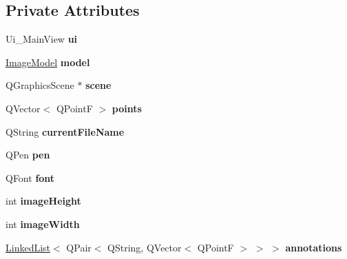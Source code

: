 \subsection*{Private Attributes}
\begin{DoxyCompactItemize}
\item 
\mbox{\label{classImageController_ac4a8d61dbfe0c1a0b63f7cd456b3c1c1}} 
Ui\+\_\+\+Main\+View {\bfseries ui}
\item 
\mbox{\label{classImageController_a7b83dbab8de169f4c1d394a72280aec5}} 
\hyperlink{classImageModel}{Image\+Model} {\bfseries model}
\item 
\mbox{\label{classImageController_a3389aebb69eca6fc69b6e8941833838c}} 
Q\+Graphics\+Scene $\ast$ {\bfseries scene}
\item 
\mbox{\label{classImageController_abbe3841123ea72ac5908481aa1a8bb78}} 
Q\+Vector$<$ Q\+PointF $>$ {\bfseries points}
\item 
\mbox{\label{classImageController_a65207ea07bfafb60210dcaedba508613}} 
Q\+String {\bfseries current\+File\+Name}
\item 
\mbox{\label{classImageController_a9ceb4137ecb9d9e768da75721fbf34f1}} 
Q\+Pen {\bfseries pen}
\item 
\mbox{\label{classImageController_aa6955d96d23c8077d3d4ec6bea43c582}} 
Q\+Font {\bfseries font}
\item 
\mbox{\label{classImageController_a89b0d15d554d591287eaa4e467d9846d}} 
int {\bfseries image\+Height}
\item 
\mbox{\label{classImageController_a5987d06965f6073f2b32f8e4a1797791}} 
int {\bfseries image\+Width}
\item 
\mbox{\label{classImageController_a62172cc78d8977b0d45b69c458ffafc7}} 
\hyperlink{classLinkedList}{Linked\+List}$<$ Q\+Pair$<$ Q\+String, Q\+Vector$<$ Q\+PointF $>$ $>$ $>$ {\bfseries annotations}
\end{DoxyCompactItemize}


